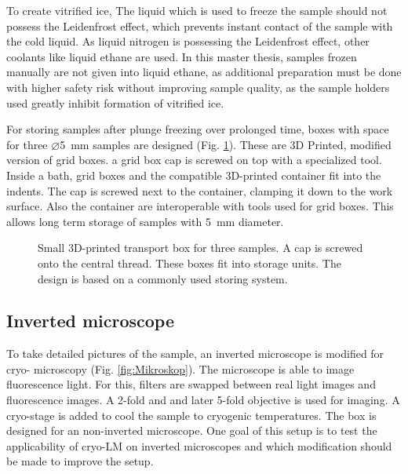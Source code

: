 To create vitrified ice, The liquid which is used to freeze the sample should not possess the Leidenfrost effect, which prevents instant contact of the sample with the cold liquid. As liquid nitrogen is possessing the Leidenfrost effect, other coolants like liquid ethane are used. In this master thesis, samples frozen manually are not given into liquid ethane, as additional preparation must be done with higher safety risk without improving sample quality, as the sample holders used greatly inhibit formation of vitrified ice.

For storing samples after plunge freezing over prolonged time, boxes with space for three $\varnothing$\SI{5}{\milli\meter} samples are designed (Fig. \ref{fig:transportbox}). These are 3D Printed, modified version of grid boxes. a grid box cap is screwed on top with a specialized tool. Inside a bath, grid boxes and the compatible 3D-printed container fit into the indents. The cap is screwed next to the container, clamping it down to the work surface. Also the container are interoperable with tools used for grid boxes. This allows long term storage of samples with \SI{5}{\milli\meter} diameter.

\begin{figure}
	\centering
	
	\caption{Small 3D-printed transport box for three samples. A cap is screwed onto the central thread. These boxes fit into storage units. The design is based on a commonly used storing system.}
	\label{fig:transportbox}
\end{figure}

\subsection{Inverted microscope}

To take detailed pictures of the sample, an inverted microscope is modified for cryo- microscopy (Fig. \ref{fig:Mikroskop}). The microscope is able to image fluorescence light. For this, filters are swapped between real light images and fluorescence images. A 2-fold and and later 5-fold objective is used for imaging. A cryo-stage is added to cool the sample to cryogenic temperatures. The box is designed for an non-inverted microscope. One goal of this setup is to test the applicability of cryo-LM on inverted microscopes and which modification should be made to improve the setup.

